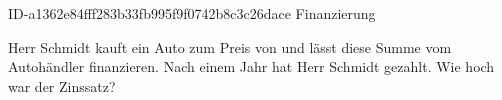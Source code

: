 \begin{exercise}
      {ID-a1362e84fff283b33fb995f9f0742b8c3c26dace}
      {Finanzierung}
  \ifproblem\problem\par
    Herr Schmidt kauft ein Auto zum Preis von  und lässt diese
    Summe vom Autohändler finanzieren. Nach einem Jahr hat Herr Schmidt
     gezahlt. Wie hoch war der Zinssatz?
  \fi
\end{exercise}
